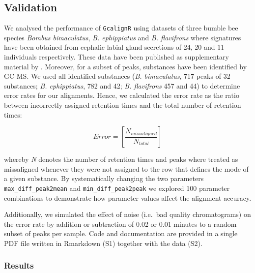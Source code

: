 \subsection{Validation}\label{validation}

We analysed the performance of \texttt{GcalignR} using datasets of three
bumble bee species \emph{Bombus bimaculatus}, \emph{B. ephippiatus} and
\emph{B. flavifrons} where signatures have been obtained from cephalic
labial gland secretions of 24, 20 and 11 individuals respectively. These
data have been published as supplementary material by
\citet{Dellicour.2013}. Moreover, for a subset of peaks, substances have
been identified by GC-MS. We used all identified substances (\emph{B.
bimaculatus}, 717 peaks of 32 substances; \emph{B. ephippiatus}, 782 and
42; \emph{B. flavifrons} 457 and 44) to determine error rates for our
alignments. Hence, we calculated the error rate as the ratio between
incorrectly assigned retention times and the total number of retention
times:

\begin{equation}
Error = \left[\frac{N_{missaligned}}{N_{total}}\right] 
\end{equation}

whereby \emph{N} denotes the number of retention times and peaks where
treated as missaligned whenever they were not assigned to the row that
defines the mode of a given substance. By systematically changing the
two parameters \texttt{max\_diff\_peak2mean} and
\texttt{min\_diff\_peak2peak} we explored 100 parameter combinations to
demonstrate how parameter values affect the alignment accuracy. \par
Additionally, we simulated the effect of noise (i.e.~bad quality
chromatograms) on the error rate by addition or subtraction of 0.02 or
0.01 minutes to a random subset of peaks per sample. Code and
documentation are provided in a single PDF file written in Rmarkdown
(S1) together with the data (S2).

\subsubsection{Results}\label{results}

